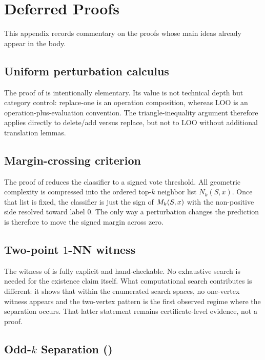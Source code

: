 \section{Deferred Proofs}
\label{sec:app-proofs}

This appendix records commentary on the proofs whose main ideas already appear
in the body.

\subsection{Uniform perturbation calculus}

The proof of  is intentionally elementary.  Its value is not
technical depth but category control: replace-one is an operation composition,
whereas LOO is an operation-plus-evaluation convention.  The triangle-inequality
argument therefore applies directly to delete/add versus replace, but not to LOO
without additional translation lemmas.

\subsection{Margin-crossing criterion}

The proof of  reduces the classifier to a signed vote threshold.
All geometric complexity is compressed into the ordered top-$k$ neighbor list
$N_k(S,x)$.  Once that list is fixed, the classifier is just the sign of
$M_k(S,x)$ with the non-positive side resolved toward label $0$.  The only way
a perturbation changes the prediction is therefore to move the signed margin
across zero.

\subsection{Two-point $1$-NN witness}

The witness of  is fully explicit and hand-checkable.  No
exhaustive search is needed for the existence claim itself.  What computational
search contributes is different: it shows that within the enumerated search
spaces, no one-vertex witness appears and the two-vertex pattern is the first
observed regime where the separation occurs.  That latter statement remains
certificate-level evidence, not a proof.

\subsection{Odd-$k$ Separation ()}

